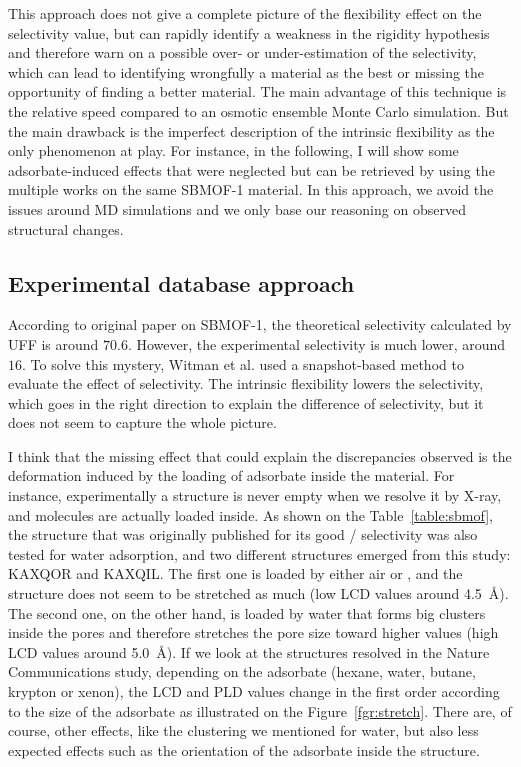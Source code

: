 \documentclass[main]{subfiles}
\begin{document}
This approach does not give a complete picture of the flexibility effect on the selectivity value, but can rapidly identify a weakness in the rigidity hypothesis and therefore warn on a possible over- or under-estimation of the selectivity, which can lead to identifying wrongfully a material as the best or missing the opportunity of finding a better material. The main advantage of this technique is the relative speed compared to an osmotic ensemble Monte Carlo simulation.\autocite{Bousquet2012} But the main drawback is the imperfect description of the intrinsic flexibility as the only phenomenon at play. For instance, in the following, I will show some adsorbate-induced effects that were neglected but can be retrieved by using the multiple works on the same SBMOF-1 material. In this approach, we avoid the issues around MD simulations and we only base our reasoning on observed structural changes. 


\subsection{Experimental database approach}

According to original paper on SBMOF-1,\autocite{Banerjee_2016} the theoretical selectivity calculated by UFF is around $70.6$. However, the experimental selectivity is much lower, around $16$. To solve this mystery, Witman et al. used a snapshot-based method to evaluate the effect of selectivity. The intrinsic flexibility lowers the selectivity, which goes in the right direction to explain the difference of selectivity, but it does not seem to capture the whole picture. 

I think that the missing effect that could explain the discrepancies observed is the deformation induced by the loading of adsorbate inside the material. For instance, experimentally a structure is never empty when we resolve it by X-ray, and molecules are actually loaded inside. As shown on the Table~\ref{table:sbmof}, the structure that was originally published for its good / selectivity\autocite{Yeh2012,Banerjee2012} was also tested for water adsorption, and two different structures emerged from this study: KAXQOR and KAXQIL. The first one is loaded by either air or , and the structure does not seem to be stretched as much (low LCD values around \SI{4.5}{\angstrom}). The second one, on the other hand, is loaded by water that forms big clusters inside the pores and therefore stretches the pore size toward higher values (high LCD values around \SI{5.0}{\angstrom}). If we look at the structures resolved in the Nature Communications study\autocite{Banerjee_2016}, depending on the adsorbate (hexane, water, butane, krypton or xenon), the LCD and PLD values change in the first order according to the size of the adsorbate as illustrated on the Figure~\ref{fgr:stretch}. There are, of course, other effects, like the clustering we mentioned for water, but also less expected effects such as the orientation of the adsorbate inside the structure. 
\end{document}
